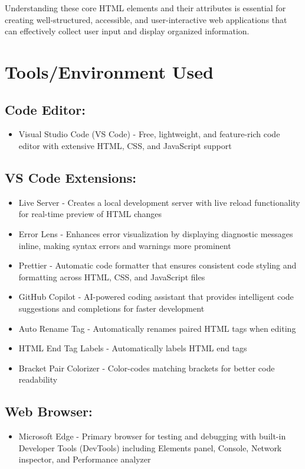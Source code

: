 \documentclass[twoside]{article}
\begin{document}
Understanding these core HTML elements and their attributes is essential for creating well-structured, accessible, and user-interactive web applications that can effectively collect user input and display organized information.


\section{Tools/Environment Used}

\subsection*{Code Editor:}
\begin{itemize}
    \item Visual Studio Code (VS Code) - Free, lightweight, and feature-rich code editor with extensive HTML, CSS, and JavaScript support
\end{itemize}

\subsection*{VS Code Extensions:}
\begin{itemize}
    \item Live Server - Creates a local development server with live reload functionality for real-time preview of HTML changes
    \item Error Lens - Enhances error visualization by displaying diagnostic messages inline, making syntax errors and warnings more prominent
    \item Prettier - Automatic code formatter that ensures consistent code styling and formatting across HTML, CSS, and JavaScript files
    \item GitHub Copilot - AI-powered coding assistant that provides intelligent code suggestions and completions for faster development
    \item Auto Rename Tag - Automatically renames paired HTML tags when editing
    \item HTML End Tag Labels - Automatically labels HTML end tags
    \item Bracket Pair Colorizer - Color-codes matching brackets for better code readability
\end{itemize}

\subsection*{Web Browser:}
\begin{itemize}
    \item Microsoft Edge - Primary browser for testing and debugging with built-in Developer Tools (DevTools) including Elements panel, Console, Network inspector, and Performance analyzer
\end{itemize}
\end{document}
